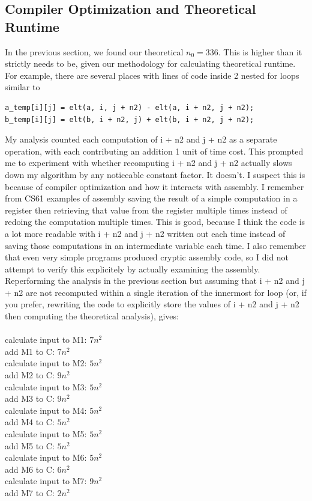 \documentclass{article}
\begin{document}
\subsection*{Compiler Optimization and Theoretical Runtime}
In the previous section, we found our theoretical $n_0 = 336$. This is higher than it strictly needs to be, given our methodology for calculating theoretical runtime. For example, there are several places with lines of code inside 2 nested for loops similar to

\begin{verbatim}
a_temp[i][j] = elt(a, i, j + n2) - elt(a, i + n2, j + n2);
b_temp[i][j] = elt(b, i + n2, j) + elt(b, i + n2, j + n2);
\end{verbatim}

My analysis counted each computation of i + n2 and j + n2 as a separate operation, with each contributing an addition 1 unit of time cost. This prompted me to experiment with whether recomputing i + n2 and j + n2 actually slows down my algorithm by any noticeable constant factor. It doesn't. I suspect this is because of compiler optimization and how it interacts with assembly. I remember from CS61 examples of assembly saving the result of a simple computation in a register then retrieving that value from the register multiple times instead of redoing the computation multiple times. This is good, because I think the code is a lot more readable with i + n2 and j + n2 written out each time instead of saving those computations in an intermediate variable each time.  I also remember that even very simple programs produced cryptic assembly code, so I did not attempt to verify this explicitely by actually examining the assembly. Reperforming the analysis in the previous section but assuming that i + n2 and j + n2 are not recomputed within a single iteration of the innermost for loop (or, if you prefer, rewriting the code to explicitly store the values of i + n2 and j + n2 then computing the theoretical analysis), gives:\\\\
calculate input to M1: $7n^2$\\
add M1 to C: $7 n^2$\\
calculate input to M2: $5n^2$\\
add M2 to C: $9n^2$\\
calculate input to M3: $5n^2$\\
add M3 to C: $9 n^2$\\
calculate input to M4: $5n^2$\\
add M4 to C: $5n^2$\\
calculate input to M5: $5n^2$\\
add M5 to C: $5 n^2$\\
calculate input to M6: $5 n^2$\\
add M6 to C: $6 n^2$\\
calculate input to M7: $9 n^2$\\
add M7 to C: $2n^2$
\end{document}
